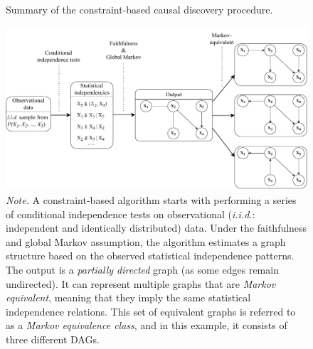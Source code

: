 \documentclass[twoside, 11pt]{article}
\begin{document}
\begin{figure}[t]
    \centering
        \caption{Summary of the constraint-based causal discovery procedure.}
        \includegraphics[width=1.0\textwidth]{figures/Fig3.pdf}
        \vspace{0.1mm}
        \caption*{\small{\textit{Note.} A constraint-based algorithm starts with performing a series of conditional independence tests on observational (\textit{i.i.d.}: independent and identically distributed) data. Under the faithfulness and global Markov assumption, the algorithm estimates a graph structure based on the observed statistical independence patterns. The output is a \textit{partially directed} graph (as some edges remain undirected). It can represent multiple graphs that are \textit{Markov equivalent}, meaning that they imply the same statistical independence relations. This set of equivalent graphs is referred to as a \textit{Markov equivalence class}, and in this example, it consists of three different DAGs.}}
    \label{fig:3}
\end{figure}
\end{document}

